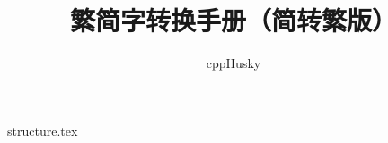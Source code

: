 \documentclass[12pt]{ctexbook}
\title{\sffamily 繁简字转换手册（简转繁版）}
\author{cppHusky}
\date{}
\begin{document}
\maketitle
\thispagestyle{empty}
{structure.tex}
\end{document}
